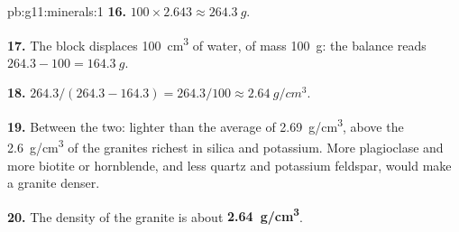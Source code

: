 \begin{solution}{pb:g11:minerals:1}
\textbf{16.} $100 \times 2.643 \approx \qty{264.3}{g}$.

\textbf{17.} The block displaces \qty{100}{cm^3} of water, of mass
\qty{100}{g}: the balance reads $264.3 - 100 = \qty{164.3}{g}$.

\textbf{18.} $264.3/(264.3 - 164.3) = 264.3/100 \approx \qty{2.64}{g/cm^3}$.

\textbf{19.} Between the two: lighter than the average of \qty{2.69}{g/cm^3},
above the \qty{2.6}{g/cm^3} of the granites richest in silica and potassium.
More plagioclase and more biotite or hornblende, and less quartz and
potassium feldspar, would make a granite denser.

\textbf{20.} The density of the granite is about
\textbf{\qty{2.64}{g/cm^3}}.
\end{solution}
